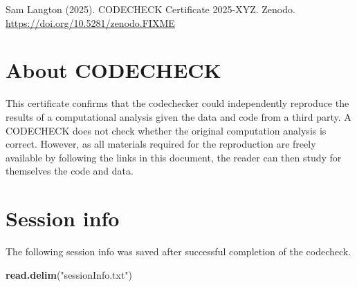 \documentclass[
]{article}
\newenvironment{Shaded}{\begin{snugshade}}{\end{snugshade}}
\newcommand{\FunctionTok}[1]{\textcolor[rgb]{0.13,0.29,0.53}{\textbf{#1}}}
\newcommand{\NormalTok}[1]{#1}
\newcommand{\StringTok}[1]{\textcolor[rgb]{0.31,0.60,0.02}{#1}}
\begin{document}
Sam Langton (2025). CODECHECK Certificate 2025-XYZ. Zenodo.
\url{https://doi.org/10.5281/zenodo.FIXME}

\section{About CODECHECK}\label{about-codecheck}

This certificate confirms that the codechecker could independently
reproduce the results of a computational analysis given the data and
code from a third party. A CODECHECK does not check whether the original
computation analysis is correct. However, as all materials required for
the reproduction are freely available by following the links in this
document, the reader can then study for themselves the code and data.

\section{Session info}\label{session-info}

The following session info was saved after successful completion of the
codecheck.

\begin{Shaded}
\begin{Highlighting}[]
\FunctionTok{read.delim}\NormalTok{(}\StringTok{"sessionInfo.txt"}\NormalTok{)}
\end{Highlighting}
\end{Shaded}
\end{document}
